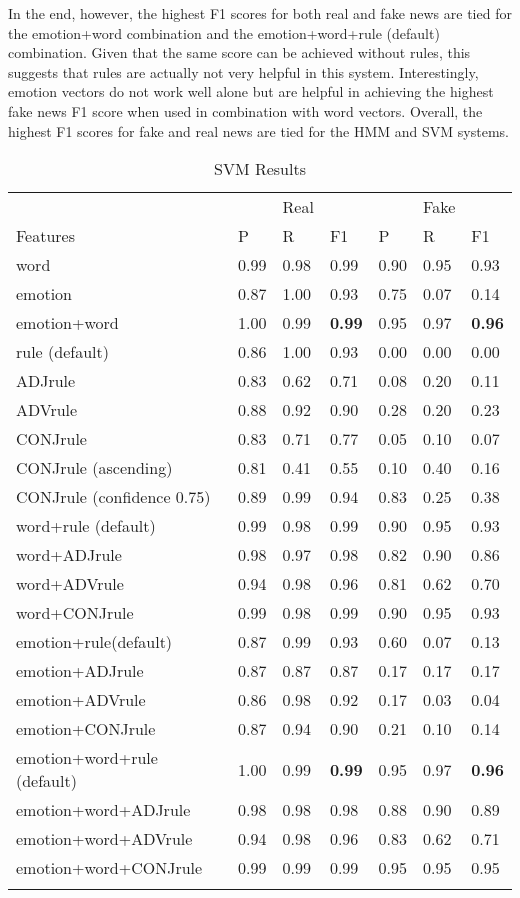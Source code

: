 \documentclass [11pt, proquest] {uwthesis}[2020/02/24]
\begin{document}
In the end, however, the highest F1 scores for both real and fake news are tied for the emotion+word combination and the emotion+word+rule (default) combination. Given that the same score can be achieved without rules, this suggests that rules are actually not very helpful in this system. Interestingly, emotion vectors do not work well alone but are helpful in achieving the highest fake news F1 score when used in combination with word vectors. Overall, the highest F1 scores for fake and real news are tied for the HMM and SVM systems.
\begin{longtable}{p{8cm}p{1cm}p{1cm}p{1cm}p{1cm}p{1cm}p{1cm}}
  &&Real&&&Fake\\
 Features&P&R&F1&P&R&F1\\
 \hline
 word&0.99&0.98&0.99&0.90&0.95&0.93 \\
 emotion&0.87&1.00&0.93&0.75&0.07&0.14 \\
 emotion+word&1.00&0.99&\textbf{0.99}&0.95&0.97&\textbf{0.96}\\
 rule (default)&0.86&1.00&0.93&0.00&0.00&0.00\\
 ADJrule&0.83&0.62&0.71&0.08&0.20&0.11\\
 ADVrule &0.88&0.92&0.90&0.28&0.20&0.23\\
 CONJrule &0.83&0.71&0.77&0.05&0.10&0.07\\
 CONJrule (ascending) &0.81&0.41&0.55&0.10&0.40&0.16\\
 CONJrule (confidence 0.75) &0.89&0.99&0.94&0.83&0.25&0.38\\
 word+rule (default)&0.99&0.98&0.99&0.90&0.95&0.93\\
 word+ADJrule&0.98&0.97&0.98&0.82&0.90&0.86 \\
 word+ADVrule &0.94&0.98&0.96&0.81&0.62&0.70\\
 word+CONJrule &0.99&0.98&0.99&0.90&0.95&0.93\\
 emotion+rule(default)&0.87&0.99&0.93&0.60&0.07&0.13\\
 emotion+ADJrule &0.87&0.87&0.87&0.17&0.17&0.17\\
 emotion+ADVrule&0.86&0.98&0.92&0.17&0.03&0.04\\
 emotion+CONJrule&0.87&0.94&0.90&0.21&0.10&0.14\\
 emotion+word+rule (default)&1.00&0.99&\textbf{0.99}&0.95&0.97&\textbf{0.96}\\
 emotion+word+ADJrule&0.98&0.98&0.98&0.88&0.90&0.89\\
 emotion+word+ADVrule&0.94&0.98&0.96&0.83&0.62&0.71\\
 emotion+word+CONJrule&0.99&0.99&0.99&0.95&0.95&0.95\\
 \hline
 \caption{SVM Results}
\end{longtable}
\end{document}
